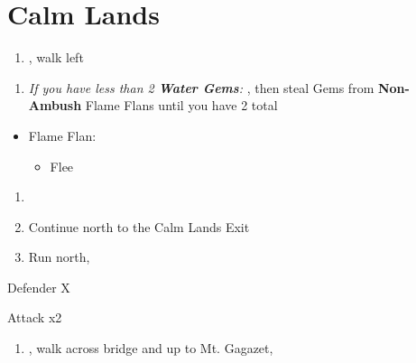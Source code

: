 \chapter{Calm Lands}

\begin{enumerate}
    \item \sd, walk left
\end{enumerate}
\begin{spheregrid}
    \begin{itemize}
        \yunaf
    \end{itemize}
\end{spheregrid}
\begin{enumerate}[resume]
    \item \textit{If you have less than 2 \textbf{Water Gems}:} \formation{\tidus}{\yuna}{\kimahri}, then steal Gems from \textbf{Non-Ambush} Flame Flans until you have 2 total
\end{enumerate}
\begin{encounters}
    \begin{itemize}
        \item Flame Flan:
        \begin{itemize}
            \rikkuf Steal
            \item Flee
        \end{itemize}
    \end{itemize}
\end{encounters}
\begin{enumerate}[resume]
    \item \formation{\tidus}{\rikku}{\kimahri}
    \item Continue north to the Calm Lands Exit
    \item Run north, \sd
\end{enumerate}
\begin{battle}[64000]{Defender X}
    \begin{itemize}
        \switch{\tidus}{\yuna}
        \summon{\bahamut}
        \bahamutf Attack x2
    \end{itemize}
\end{battle}
\begin{enumerate}[resume]
    \item \sd, walk across bridge and up to Mt. Gagazet, \sd
\end{enumerate}
